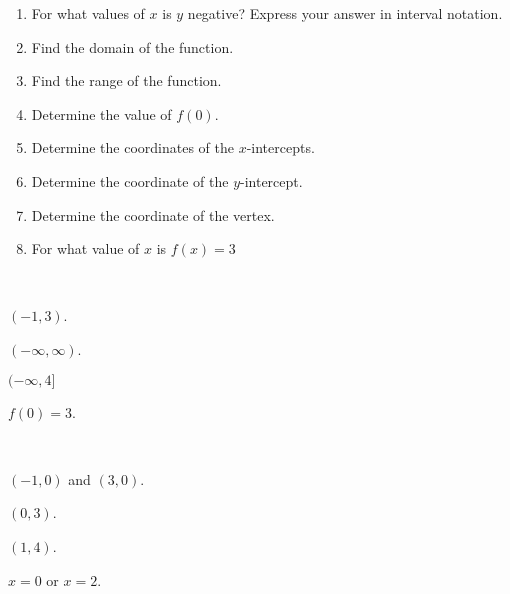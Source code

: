 \noindent 
\begin{minipage}{\textwidth}
\begin{minipage}{0.6\textwidth}
\begin{enumerate}[label={(\arabic*).},afterlabel=\quad]
\item For what values of $x$ is $y$ negative? Express your answer in interval notation. 
\item Find the domain of the function. 
\item Find the range of the function. 
\item Determine the value of $f(0)$.
\item Determine the coordinates of the $x$-intercepts.
\item Determine the coordinate of the $y$-intercept.  
\item Determine the coordinate of the vertex.
\item For what value of $x$ is $f(x)=3$
\end{enumerate}
\end{minipage}
\begin{minipage}{0.4\textwidth}
\begin{center}
\end{center}
\end{minipage}
\end{minipage}
\begin{solution}\mbox{}\\
\begin{enumerate*}[label={(\arabic*)},itemjoin=\qquad]
	\item $(-1, 3)$.
	\item $(-\infty, \infty)$.
	\item $(-\infty, 4]$
	\item $f(0)=3$.
\end{enumerate*}\\
\begin{enumerate*}[resume*]
	\item $(-1,0)$ and $(3,0)$.
	\item $(0, 3)$.
	\item $(1, 4)$.
	\item $x=0$ or $x=2$.
\end{enumerate*}
\end{solution}